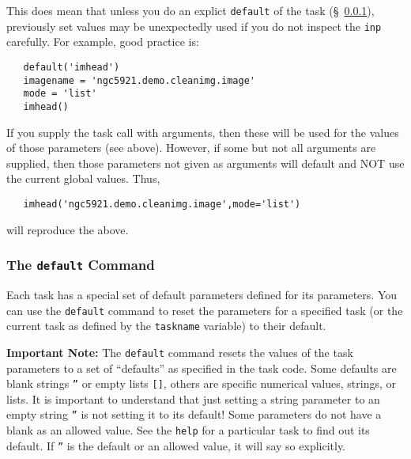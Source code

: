 This does mean that unless you do an explict {\tt default} of the task
(\S~\ref{section:intro.tasks.setpar.default}), previously set values
may be unexpectedly used if you do not inspect the {\tt inp}
carefully.  For example, good practice is:
\small
\begin{verbatim}
   default('imhead')
   imagename = 'ngc5921.demo.cleanimg.image'
   mode = 'list'
   imhead()
\end{verbatim}
\normalsize

If you supply the task call with arguments, then these will be used
for the values of those parameters (see above).  However, if some but
not all arguments are supplied, then those parameters not given as
arguments will default and NOT use the current global values.  Thus,
\small
\begin{verbatim}
   imhead('ngc5921.demo.cleanimg.image',mode='list')
\end{verbatim}
\normalsize
will reproduce the above.

\subsubsection{The {\tt default} Command}
\label{section:intro.tasks.setpar.default}

Each task has a special set of default parameters defined for its
parameters.  You can use the {\tt default} command to reset the
parameters for a specified task (or the current task as defined
by the {\tt taskname} variable) to their default. 

{\bf Important Note:} The {\tt default} command resets the values
of the task parameters to a set of ``defaults'' as specified in
the task code.  Some defaults are blank strings {\tt ''} or 
empty lists {\tt []}, others are specific numerical values, strings,
or lists.  It is important to understand that just setting a string
parameter to an empty string {\tt ''} is not setting it to its 
default!  Some parameters do not have a blank as an allowed value.
See the {\tt help} for a particular task to find out its default.
If {\tt ''} is the default or an allowed value, it will say so
explicitly.

